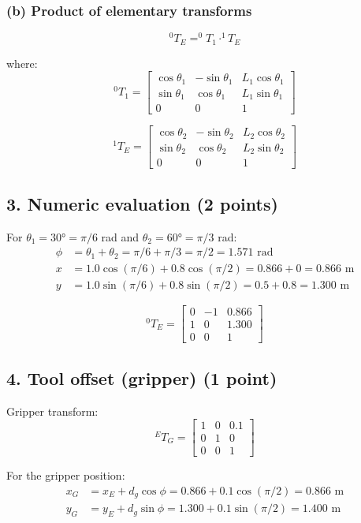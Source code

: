 \documentclass[11pt]{article}
\begin{document}
\subsubsection*{(b) Product of elementary transforms}
$$^0 T_E = ^0 T_1 \cdot ^1 T_E$$

where:
$$^0 T_1 = \begin{bmatrix}
\cos\theta_1 & -\sin\theta_1 & L_1\cos\theta_1 \\
\sin\theta_1 & \cos\theta_1 & L_1\sin\theta_1 \\
0 & 0 & 1
\end{bmatrix}$$

$$^1 T_E = \begin{bmatrix}
\cos\theta_2 & -\sin\theta_2 & L_2\cos\theta_2 \\
\sin\theta_2 & \cos\theta_2 & L_2\sin\theta_2 \\
0 & 0 & 1
\end{bmatrix}$$

\subsection*{3. Numeric evaluation (2 points)}
For $\theta_1 = 30° = \pi/6$ rad and $\theta_2 = 60° = \pi/3$ rad:
\begin{align}
\phi &= \theta_1 + \theta_2 = \pi/6 + \pi/3 = \pi/2 = 1.571 \text{ rad} \\
x &= 1.0\cos(\pi/6) + 0.8\cos(\pi/2) = 0.866 + 0 = 0.866 \text{ m} \\
y &= 1.0\sin(\pi/6) + 0.8\sin(\pi/2) = 0.5 + 0.8 = 1.300 \text{ m}
\end{align}

$$^0 T_E = \begin{bmatrix}
0 & -1 & 0.866 \\
1 & 0 & 1.300 \\
0 & 0 & 1
\end{bmatrix}$$

\subsection*{4. Tool offset (gripper) (1 point)}
Gripper transform:
$$^E T_G = \begin{bmatrix}
1 & 0 & 0.1 \\
0 & 1 & 0 \\
0 & 0 & 1
\end{bmatrix}$$

For the gripper position:
\begin{align}
x_G &= x_E + d_g\cos\phi = 0.866 + 0.1\cos(\pi/2) = 0.866 \text{ m} \\
y_G &= y_E + d_g\sin\phi = 1.300 + 0.1\sin(\pi/2) = 1.400 \text{ m}
\end{align}
\end{document}
